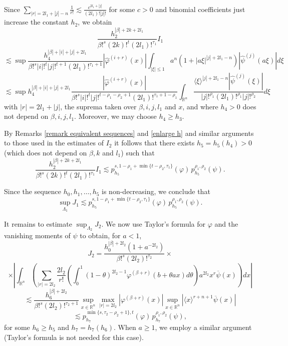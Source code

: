 \documentclass[reqno,12pt]{amsart}
\theoremstyle{plain}
\theoremstyle{definition}
\theoremstyle{remark}
\begin{document}
Since $ \displaystyle \sum_{|r|= 2l_1 + |j|-n} \frac{1 }{r!} \lesssim \frac{c ^{2l_1
+ |j|}}{(2l_1)!|j|!} $ for some $c>0$ and binomial coefficients just
increase the constant $h_2$, we obtain
$$
\frac{h_2 ^{|\beta| +2k+ 2l_1} }{ \beta!^s (2k)!^{t} (2l_1)
!^{\tau_1}} I_1
$$
$$
\lesssim \sup \frac{ h_4 ^{|\beta| +|i|+|j| + 2l_1} }{ \beta!^s
|i|!^{t} |j|!^{t+1} (2l_1) !^{\tau_1+1}}|\hat \varphi ^{(i+ r)} (x) |\int_{|\xi|\leq1}
a^{n}(1+|a\xi|^{|j|+2l_1-n}) |\hat{\psi} ^{(j)}  (a\xi)| d\xi
$$
$$
\lesssim\sup h_4 ^{|\beta| +|i|+|j| + 2l_1} \frac{
|\hat \varphi ^{(i+ r)} (x) |}{ \beta!^s |i|!^{t} |j|!^{t-
\rho_1 -\rho_2 +1} (2l_1) !^{\tau_1+1-\rho_1}}  \int_{\mathbb{R}^{n}} \frac{\langle \xi\rangle^{|j|+
2l_1-n} |{\hat\psi} ^{(j)}  (\xi)|}{|j|!^{\rho_1 }
(2l_1) !^{\rho_1}|j|!^{\rho_2 } } d\xi
$$
with $|r|= 2l_1 + |j|$, the suprema taken over $\beta, i, j,
l_1$ and $x$, and where $h_4  >0 $ does not depend on $\beta, i,
j, l_1$. Moreover, we may choose $ h_4 \geq
h_3$.

\par

By Remarks \ref{remark equivalent sequences} and \ref{enlarge h} and
similar arguments to those used in the estimates of $I_2$ it follows
that there exists $h_5 = h_5 (h_4)>0$ (which does not depend on
$\beta, k$ and $ l_1$) such that
$$
\frac{h_2 ^{|\beta| +2k+ 2l_1} }{ \beta!^s (2k)!^{t} (2l_1)
!^{\tau_1}} I_1 \lesssim p^{s, 1- \rho_1+ \min\{t  - \rho_2, \tau_1 \}} _{h_5} (\varphi) \,
p^{\rho_1, \rho_2} _{h_5}(\psi).
$$

Since the sequence $h_0,  h_1,\dots, h_5 $ is non-decreasing, we
conclude that
$$
\sup_{\Lambda_1} J_1 \lesssim p^{s, 1- \rho_1+  \min\{t  - \rho_2,
\tau_1 \}}_{h_5} (\varphi) \, p^{\rho_1, \rho_2}_{h_5} (\psi).
$$

\par

It remains to estimate $ \sup_{\Lambda_2} J_2 $. We now use
Taylor's formula for $ \varphi $ and the vanishing moments of $ \psi $
to obtain, for $a<1$,
$$
J_2 = \frac{h_0 ^{|\beta| + 2l_2}  (1 + a^{-2l_2}) }{ \beta!^s
(2 l_2)!^{\tau_2}} \times
$$
$$
\times \left|\int_{\mathbb{R}^{n}} \left(  \sum_{|r| = 2l_2} \frac{2l_2}{r!} \left(\int_0
^1 (1-\theta)^{2l_2-1} \varphi^{(\beta + r)} (b+ \theta a x )
d\theta \right) a^{2l_2} x^r \overline{\psi} (x) \right) dx\right|
$$
$$
\lesssim \frac{h_6 ^{|\beta| + 2l_2} }{ \beta!^s (2l_2) !^{\tau_2 +
1}} \sup_{x \in \mathbb{R}^n} \max_{|r|=2l_{2}} |\varphi^{(\beta + r)} (x) |
\sup_{x \in \mathbb{R}^n} | \langle x \rangle ^{r+n+1} \overline{\psi}  (x) |
$$
$$
\lesssim p^{\min\{s, \tau_2 - \rho_2 +1\}, t} _{h_7} (\varphi) \,
p^{\rho_1,  \rho_2}_{h_7} (\psi),
$$
for some $h_6 \geq h_5 $ and $ h_7 = h_7 (h_6)$. When $a\geq1$, we employ a similar argument (Taylor's formula is not needed for this case).
\end{document}
